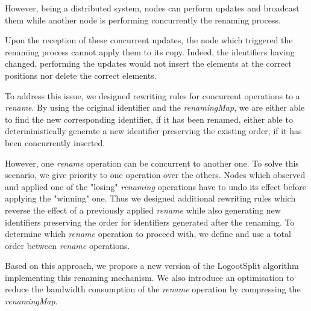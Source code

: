 \documentclass{article}
\begin{document}
However, being a distributed system, nodes can perform updates and broadcast them while another node is performing concurrently the renaming process.

Upon the reception of these concurrent updates, the node which triggered the renaming process cannot apply them to its copy.
Indeed, the identifiers having changed, performing the updates would not insert the elements at the correct positions nor delete the correct elements.

To address this issue, we designed rewriting rules for concurrent operations to a \emph{rename}.
By using the original identifier and the \emph{renamingMap}, we are either able to find the new corresponding identifier, if it has been renamed, either able to deterministically generate a new identifier preserving the existing order, if it has been concurrently inserted.

However, one \emph{rename} operation can be concurrent to another one.
To solve this scenario, we give priority to one operation over the others.
Nodes which observed and applied one of the "losing" \emph{renaming} operations have to undo its effect before applying the "winning" one.
Thus we designed additional rewriting rules which reverse the effect of a previously applied \emph{rename} while also generating new identifiers preserving the order for identifiers generated after the renaming.
To determine which \emph{rename} operation to proceed with, we define and use a total order between \emph{rename} operations.

Based on this approach, we propose a new version of the LogootSplit algorithm implementing this renaming mechanism.
We also introduce an optimisation to reduce the bandwidth consumption of the \emph{rename} operation by compressing the \emph{renamingMap}.


\end{document}
